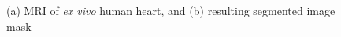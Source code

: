 \begin{figure}
\centering
{}
%
\caption{(a) MRI of \textit{ex vivo} human heart, and (b) resulting segmented image mask}
\label{fig:seg}
\end{figure}

